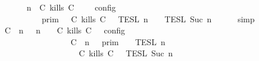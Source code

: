 \begin{isabellebody}
%
\isadelimproof
%
\endisadelimproof
%
\isatagproof
{}\isamarkupfalse%
\ {\isacharminus}\isanewline
\ \ \isamarkupfalse%
\ {\isacartoucheopen}{\isasymlbrakk}\ {\isasymGamma}{\isacharcomma}\ n\ {\isasymturnstile}\ {\isacharparenleft}{\isacharparenleft}C\ kills\ C\ {\isacharhash}\ {\isasymPsi}{\isacharparenright}\ {\isasymtriangleright}\ {\isasymPhi}\ {\isasymrbrakk}\isactrlsub c\isactrlsub o\isactrlsub n\isactrlsub f\isactrlsub i\isactrlsub g\isanewline
\ \ \ \ \ \ \ \ {\isacharequal}\ {\isasymlbrakk}{\isasymlbrakk}\ {\isasymGamma}\ {\isasymrbrakk}{\isasymrbrakk}\isactrlsub p\isactrlsub r\isactrlsub i\isactrlsub m\ {\isasyminter}\ {\isasymlbrakk}{\isasymlbrakk}\ {\isacharparenleft}C\ kills\ C\ {\isacharhash}\ {\isasymPsi}\ {\isasymrbrakk}{\isasymrbrakk}\isactrlsub T\isactrlsub E\isactrlsub S\isactrlsub L\isactrlbsup {\isasymge}\ n\isactrlesup \ {\isasyminter}\ {\isasymlbrakk}{\isasymlbrakk}\ {\isasymPhi}\ {\isasymrbrakk}{\isasymrbrakk}\isactrlsub T\isactrlsub E\isactrlsub S\isactrlsub L\isactrlbsup {\isasymge}\ Suc\ n\isactrlesup {\isacartoucheclose}\isanewline
\ \ \ \ \isamarkupfalse%
\ simp\isanewline
\ \ \isamarkupfalse%
\ \isamarkupfalse%
\ {\isacartoucheopen}{\isasymlbrakk}\ {\isacharparenleft}{\isacharparenleft}C\ {\isasymnot}{\isasymUp}\ n{\isacharparenright}\ {\isacharhash}\ {\isasymGamma}{\isacharparenright}{\isacharcomma}\ n\ {\isasymturnstile}\ {\isasymPsi}\ {\isasymtriangleright}\ {\isacharparenleft}{\isacharparenleft}C\ kills\ C\ {\isacharhash}\ {\isasymPhi}{\isacharparenright}\ {\isasymrbrakk}\isactrlsub c\isactrlsub o\isactrlsub n\isactrlsub f\isactrlsub i\isactrlsub g\isanewline
\ \ \ \ \ \ \ \ \ \ \ \ \ \ \ \ {\isacharequal}\ {\isasymlbrakk}{\isasymlbrakk}\ {\isacharparenleft}C\ {\isasymnot}{\isasymUp}\ n{\isacharparenright}\ {\isacharhash}\ {\isasymGamma}\ {\isasymrbrakk}{\isasymrbrakk}\isactrlsub p\isactrlsub r\isactrlsub i\isactrlsub m\ {\isasyminter}\ {\isasymlbrakk}{\isasymlbrakk}\ {\isasymPsi}\ {\isasymrbrakk}{\isasymrbrakk}\isactrlsub T\isactrlsub E\isactrlsub S\isactrlsub L\isactrlbsup {\isasymge}\ n\isactrlesup \isanewline
\ \ \ \ \ \ \ \ \ \ \ \ \ \ \ \ \ \ {\isasyminter}\ {\isasymlbrakk}{\isasymlbrakk}\ {\isacharparenleft}C\ kills\ C\ {\isacharhash}\ {\isasymPhi}\ {\isasymrbrakk}{\isasymrbrakk}\isactrlsub T\isactrlsub E\isactrlsub S\isactrlsub L\isactrlbsup {\isasymge}\ Suc\ n\isactrlesup {\isacartoucheclose}\ \isamarkupfalse%

\end{isabellebody}
